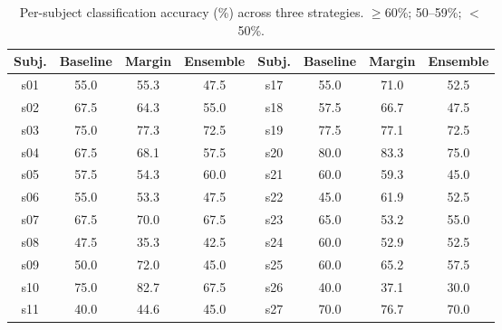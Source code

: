 \begin{table}[H]
  \centering
  \caption{Per-subject classification accuracy (\%) across three strategies.  $\geq$60\%;\enspace{} 50--59\%;\enspace{} $<$50\%.}
  \label{tab:persubject}
  \begin{tabular}{cccc|cccc}
    \toprule
    Subj. & Baseline & Margin & Ensemble & Subj. & Baseline & Margin & Ensemble \\
    \midrule
    s01 & \cellcolor{accmid}55.0 & \cellcolor{accmid}55.3 & \cellcolor{acclo}47.5 & s17 & \cellcolor{accmid}55.0 & \cellcolor{acchi}71.0 & \cellcolor{accmid}52.5 \\
    s02 & \cellcolor{acchi}67.5 & \cellcolor{acchi}64.3 & \cellcolor{accmid}55.0 & s18 & \cellcolor{accmid}57.5 & \cellcolor{acchi}66.7 & \cellcolor{acclo}47.5 \\
    s03 & \cellcolor{acchi}75.0 & \cellcolor{acchi}77.3 & \cellcolor{acchi}72.5 & s19 & \cellcolor{acchi}77.5 & \cellcolor{acchi}77.1 & \cellcolor{acchi}72.5 \\
    s04 & \cellcolor{acchi}67.5 & \cellcolor{acchi}68.1 & \cellcolor{accmid}57.5 & s20 & \cellcolor{acchi}80.0 & \cellcolor{acchi}83.3 & \cellcolor{acchi}75.0 \\
    s05 & \cellcolor{accmid}57.5 & \cellcolor{accmid}54.3 & \cellcolor{acchi}60.0 & s21 & \cellcolor{acchi}60.0 & \cellcolor{accmid}59.3 & \cellcolor{acclo}45.0 \\
    s06 & \cellcolor{accmid}55.0 & \cellcolor{accmid}53.3 & \cellcolor{acclo}47.5 & s22 & \cellcolor{acclo}45.0 & \cellcolor{acchi}61.9 & \cellcolor{accmid}52.5 \\
    s07 & \cellcolor{acchi}67.5 & \cellcolor{acchi}70.0 & \cellcolor{acchi}67.5 & s23 & \cellcolor{acchi}65.0 & \cellcolor{accmid}53.2 & \cellcolor{accmid}55.0 \\
    s08 & \cellcolor{acclo}47.5 & \cellcolor{acclo}35.3 & \cellcolor{acclo}42.5 & s24 & \cellcolor{acchi}60.0 & \cellcolor{accmid}52.9 & \cellcolor{accmid}52.5 \\
    s09 & \cellcolor{accmid}50.0 & \cellcolor{acchi}72.0 & \cellcolor{acclo}45.0 & s25 & \cellcolor{acchi}60.0 & \cellcolor{acchi}65.2 & \cellcolor{accmid}57.5 \\
    s10 & \cellcolor{acchi}75.0 & \cellcolor{acchi}82.7 & \cellcolor{acchi}67.5 & s26 & \cellcolor{acclo}40.0 & \cellcolor{acclo}37.1 & \cellcolor{acclo}30.0 \\
    s11 & \cellcolor{acclo}40.0 & \cellcolor{acclo}44.6 & \cellcolor{acclo}45.0 & s27 & \cellcolor{acchi}70.0 & \cellcolor{acchi}76.7 & \cellcolor{acchi}70.0 \\

\end{tabular}
\end{table}
